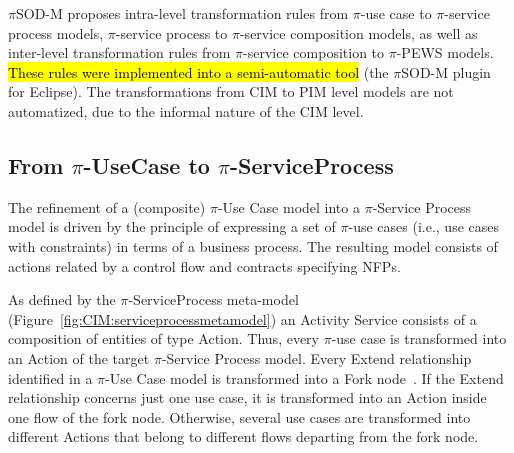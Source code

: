\documentclass{singlecol-new}
\theoremstyle{TH}{
\newtheorem{lemma}{Lemma}
\newtheorem{theorem}[lemma]{Theorem}
\newtheorem{corrolary}[lemma]{Corrolary}
\newtheorem{conjecture}[lemma]{Conjecture}
\newtheorem{proposition}[lemma]{Proposition}
\newtheorem{claim}[lemma]{Claim}
\newtheorem{stheorem}[lemma]{Wrong Theorem}
\newtheorem{algorithm}{Algorithm}
}
\theoremstyle{THrm}{
\newtheorem{definition}{Definition}[section]
\newtheorem{question}{Question}[section]
\newtheorem{remark}{Remark}
\newtheorem{scheme}{Scheme}
}
\theoremstyle{THhit}{
\newtheorem{case}{Case}[section]
}
\theoremstyle{THhsl}{
\newtheorem{example}{Example}
}
\newcommand{\pisodm}[0]{$\pi$SOD-M\xspace}
\begin{document}
\pisodm  proposes intra-level transformation rules from $\pi$-use case to $\pi$-service process models, $\pi$-service process to $\pi$-service composition  models, as well as inter-level transformation rules from $\pi$-service composition to $\pi$-PEWS models. 
\hl{These rules were implemented into a semi-automatic tool} (the \pisodm  plugin\footnotemark {} for Eclipse).
The transformations from CIM to PIM level models are not automatized, due to the informal nature of the CIM level.
 
\subsection{From $\pi$-UseCase to $\pi$-ServiceProcess}

The refinement of a (composite) $\pi$-Use Case model into a $\pi$-Service Process model is driven by the principle of expressing a set of $\pi$-use cases (i.e., use cases with constraints)   in terms of  a business process.
The resulting model consists of actions related by a control flow and contracts specifying NFPs. 

As defined by the $\pi$-ServiceProcess  meta-model (Figure~\ref{fig:CIM:serviceprocessmetamodel}) an {\sc Activity Service} consists of a composition of  entities of type {\sc Action}. 
Thus, every {\sf $\pi$-use case} is transformed into an {\sf Action} of the target $\pi$-Service Process model.  
Every {\sf Extend} relationship identified in a $\pi$-Use Case model is
transformed into a  {\sf Fork node}~\cite{valeriaThesis}.%
If the {\sf Extend} relationship concerns just one {\sf use case}, it is transformed into an {\sf Action} inside one flow of the fork node. 
Otherwise, several  {\sf use cases} are transformed into different {\sf Actions} that belong to different flows departing from the fork node.   
\end{document}
